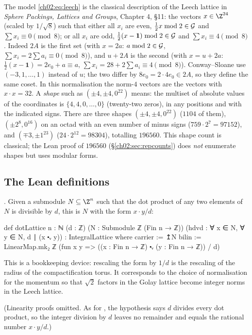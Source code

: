 \begin{remark}\label{ch02:rem:cs}
The model \eqref{ch02:eq:leech} is the classical description of the Leech lattice in
\emph{Sphere Packings, Lattices and Groups}, Chapter 4, \S11: the vectors $x\in\Z^{24}$
(scaled by $1/\sqrt8$) such that either all $x_i$ are even, $\tfrac12x\bmod2\in\mathcal{G}$ and
$\sum x_i\equiv0\pmod 8$; or all $x_i$ are odd, $\tfrac12(x-\mathbf1)\bmod2\in\mathcal{G}$ and $\sum
x_i\equiv4\pmod8$.  Indeed $2A$ is the first set (with $x=2a$: $a\bmod2\in\mathcal{G}$, $\sum
x_i=2\sum a_i\equiv0\pmod8$), and $u+2A$ is the second (with $x=u+2a$: $\tfrac12(x-\mathbf
1)=2e_0+a\equiv a$, $\sum x_i=28+2\sum a_i\equiv4\pmod 8$).  Conway--Sloane use
$(-3,1,\dots,1)$ instead of $u$; the two differ by $8e_0=2\cdot4e_0\in2A$, so they define the
same coset.  In this normalisation the norm-$4$ vectors are the vectors with $x\cdot x=32$.  A
\emph{shape} such as $(\pm4,\pm4,0^{22})$ means: the multiset of absolute values of the
coordinates is $\{4,4,0,\dots,0\}$ (twenty-two zeros), in any positions and with the indicated
signs.  There are three shapes $(\pm4,\pm4,0^{22})$ ($1104$ of them), $(\pm2^8,0^{16})$ on an octad with an even
number of minus signs ($759\cdot2^7=97152$), and $(\mp3,\pm1^{23})$ ($24\cdot2^{12}=98304$),
totalling $196560$.  This shape count is classical; the Lean proof of $196560$
(\S\ref{ch02:sec:repcounts}) does \emph{not} enumerate shapes but uses modular forms.
\end{remark}

\subsection{The Lean definitions}

\begin{definition}
.  Given a submodule $N\subseteq\Z^n$ such that
the dot product of any two elements of $N$ is divisible by $d$, this is $N$ with the form
$x\cdot y/d$:
\end{definition}
\begin{leancode}
def dotLattice {n : ℕ} (d : ℤ) (N : Submodule ℤ (Fin n → ℤ))
    (hdvd : ∀ x ∈ N, ∀ y ∈ N, d ∣ (x ⬝ᵥ y)) : IntegralLattice where
  carrier := ↥N
  bilin := LinearMap.mk₂ ℤ
    (fun x y => ((x : Fin n → ℤ) ⬝ᵥ (y : Fin n → ℤ)) / d)
\end{leancode}
\begin{physics}
This is a bookkeeping device: rescaling the form by $1/d$ is the rescaling of the radius of the compactification torus. It corresponds to the choice of normalisation for the momentum so that $\sqrt2$ factors in the Golay lattice become integer norms in the Leech lattice.
\end{physics}
(Linearity proofs omitted.  As for , the hypothesis  says $d$
divides every dot product, so the integer division by $d$ leaves no remainder and equals the
rational number $x\cdot y/d$.)

